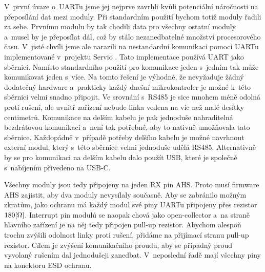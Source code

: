 V~první úvaze o~UARTu jsme jej nejprve zavrhli kvůli potenciální náročnosti na přeposílání dat mezi moduly.
Při standardním použití bychom totiž moduly řadili za sebe.
Prvnímu modulu by tak chodili data pro všechny ostatní moduly a~musel by je přeposílat dál, což by stálo nezanedbatelné množství procesorového času.
V~jisté chvíli jsme ale narazili na nestandardní komunikaci pomocí UARTu implementované v~projektu Servio \cite{Servio}.
Tato implementace používá UART jako sběrnici.
Namísto standardního použití pro komunikace jeden s~jedním tak může komunikovat jeden s~více.
Na tomto řešení je výhodné, že nevyžaduje žádný dodatečný hardware a~prakticky každý dnešní mikrokontroler je možné k~této sběrnici velmi snadno připojit.
Ve srovnání s~RS485 je sice mnohem méně odolná proti rušení, ale uvnitř zařízení nebude linka vedena na víc než malé desítky centimetrů.
Komunikace na delším kabelu je pak jednoduše nahraditelná bezdrátovou komunikací a~není tak potřebné, aby to nativně umožňovala tato sběrnice.
Každopádně v~případě potřeby delšího kabelu je možné navrhnout externí modul, který s~této sběrnice velmi jednoduše udělá RS485.
Alternativně by se pro komunikaci na delším kabelu dalo použít USB, které je společně s~nabíjením přivedeno na USB-C.

Všechny moduly jsou tedy připojeny na jeden RX pin AHS.
Proto musí firmware AHS zajistit, aby dva moduly nevysílaly současně.
Aby se zabránilo možným zkratům, jako ochranu má každý modul své piny UARTu připojeny přes rezistor \(180\-[\Omega]\).
Interrupt pin modulů se naopak chová jako open-collector a~na straně hlavního zařízení je na něj tedy připojen pull-up rezistor.
Abychom alespoň trochu zvýšili odolnost linky proti rušení, přidáme na přijímací stranu pull-up rezistor.
Cílem je zvýšení komunikačního proudu, aby se případný proud vyvolaný rušením dal jednodušeji zanedbat.
V~neposlední řadě mají všechny piny na konektoru ESD ochranu.

\newpage
